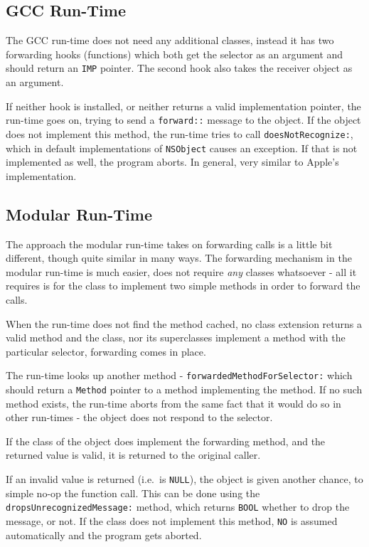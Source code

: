 \subsection{GCC Run-Time}

The GCC run-time does not need any additional classes, instead it has two forwarding hooks (functions) which both get the selector as an argument and should return an \verb=IMP= pointer. The second hook also takes the receiver object as an argument.

If neither hook is installed, or neither returns a valid implementation pointer, the run-time goes on, trying to send a \verb=forward::= message to the object. If the object does not implement this method, the run-time tries to call \verb=doesNotRecognize:=, which in default implementations of \verb=NSObject= causes an exception. If that is not implemented as well, the program aborts. In general, very similar to Apple's implementation.

\subsection{Modular Run-Time}
 
The approach the modular run-time takes on forwarding calls is a little bit different, though quite similar in many ways. The forwarding mechanism in the modular run-time is much easier, does not require \emph{any} classes whatsoever - all it requires is for the class to implement two simple methods in order to forward the calls.

When the run-time does not find the method cached, no class extension returns a valid method and the class, nor its superclasses implement a method with the particular selector, forwarding comes in place.

The run-time looks up another method - \verb=forwardedMethodForSelector:= which should return a \verb=Method= pointer to a method implementing the method. If no such method exists, the run-time aborts from the same fact that it would do so in other run-times - the object does not respond to the selector.

If the class of the object does implement the forwarding method, and the returned value is valid, it is returned to the original caller.

If an invalid value is returned (i.e.\ is \verb=NULL=), the object is given another chance, to simple no-op the function call. This can be done using the \verb=dropsUnrecognizedMessage:= method, which returns \verb=BOOL= whether to drop the message, or not. If the class does not implement this method, \verb=NO= is assumed automatically and the program gets aborted.

